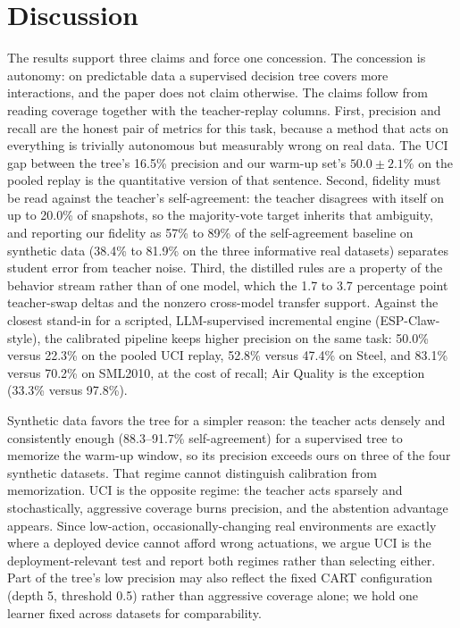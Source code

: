 \documentclass[review]{elsarticle}
\begin{document}
\section{Discussion}

The results support three claims and force one concession. The concession is
autonomy: on predictable data a supervised decision tree covers more
interactions, and the paper does not claim otherwise. The claims follow from
reading coverage together with the teacher-replay columns. First, precision
and recall are the honest pair of metrics for this task, because a method
that acts on everything is trivially autonomous but measurably wrong on real
data. The UCI gap between the tree's 16.5\% precision and our warm-up set's
$50.0 \pm 2.1\%$ on the pooled replay is the quantitative version of that
sentence. Second, fidelity must be read against the teacher's
self-agreement: the teacher disagrees with itself on up to 20.0\% of
snapshots, so the majority-vote target inherits that ambiguity, and reporting
our fidelity as 57\% to 89\% of the self-agreement baseline on synthetic data
(38.4\% to 81.9\% on the three informative real datasets) separates student
error from teacher noise. Third, the distilled rules are a property of the
behavior stream rather than of one model, which the 1.7 to 3.7 percentage
point teacher-swap deltas and the nonzero cross-model transfer support.
Against the closest stand-in for a scripted, LLM-supervised incremental engine
(ESP-Claw-style), the calibrated pipeline keeps higher precision on the same
task: 50.0\% versus 22.3\% on the pooled UCI replay, 52.8\% versus 47.4\% on
Steel, and 83.1\% versus 70.2\% on SML2010, at the cost of recall; Air Quality
is the exception (33.3\% versus 97.8\%).

Synthetic data favors the tree for a simpler reason: the teacher acts densely
and consistently enough (88.3--91.7\% self-agreement) for a supervised tree to
memorize the warm-up window, so its precision exceeds ours on three of the
four synthetic datasets. That regime cannot distinguish
calibration from memorization. UCI is the opposite regime: the teacher acts
sparsely and stochastically, aggressive coverage burns precision, and the
abstention advantage appears. Since low-action, occasionally-changing real
environments are exactly where a deployed device cannot afford wrong
actuations, we argue UCI is the deployment-relevant test and report both
regimes rather than selecting either. Part of the tree's low precision may
also reflect the fixed CART configuration (depth 5, threshold 0.5) rather
than aggressive coverage alone; we hold one learner fixed across datasets for
comparability.
\end{document}
